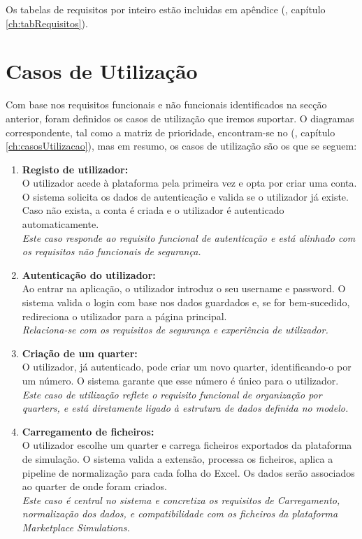 Os tabelas de requisitos por inteiro estão incluidas em apêndice (\cf, capítulo \ref{ch:tabRequisitos}).

\section{Casos de Utilização}

Com base nos requisitos funcionais e não funcionais identificados na secção anterior, foram definidos os casos de utilização que iremos suportar. O diagramas correspondente, tal como a matriz de prioridade, encontram-se no (\cf, capítulo \ref{ch:casosUtilizacao}), mas em resumo, os casos de utilização são os que se seguem:

\begin{enumerate}
    \item \textbf{Registo de utilizador: } \\
    O utilizador acede à plataforma pela primeira vez e opta por criar uma conta. O sistema solicita os dados de autenticação e valida se o utilizador já existe. Caso não exista, a conta é criada e o utilizador é autenticado automaticamente. \\
    \textit{Este caso responde ao requisito funcional de autenticação e está alinhado com os requisitos não funcionais de segurança.}
    
    \item \textbf{Autenticação do utilizador: } \\
    Ao entrar na aplicação, o utilizador introduz o seu username e password. O sistema valida o login com base nos dados guardados e, se for bem-sucedido, redireciona o utilizador para a página principal. \\
    \textit{Relaciona-se com os requisitos de segurança e experiência de utilizador.}
    
    \item \textbf{Criação de um quarter: } \\
    O utilizador, já autenticado, pode criar um novo quarter, identificando-o por um número. O sistema garante que esse número é único para o utilizador. \\
    \textit{Este caso de utilização reflete o requisito funcional de organização por quarters, e está diretamente ligado à estrutura de dados definida no modelo.}
    
    \item \textbf{Carregamento de ficheiros: } \\
    O utilizador escolhe um quarter e carrega ficheiros exportados da plataforma de simulação. O sistema valida a extensão, processa os ficheiros, aplica a pipeline de normalização para cada folha do Excel. Os dados serão associados ao quarter de onde foram criados. \\
    \textit{Este caso é central no sistema e concretiza os requisitos de Carregamento, normalização dos dados, e compatibilidade com os ficheiros da plataforma Marketplace Simulations.}


\end{enumerate}
